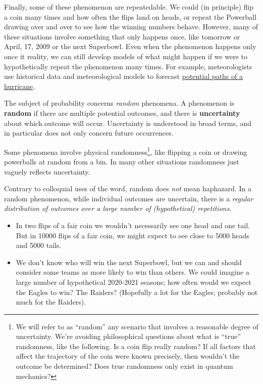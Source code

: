 \documentclass[
]{book}
\providecommand{\tightlist}{%
  \setlength{\itemsep}{0pt}\setlength{\parskip}{0pt}}
\theoremstyle{definition}
\theoremstyle{definition}
\theoremstyle{definition}
\theoremstyle{remark}
\begin{document}
Finally, some of these phenomenon are repeatedable. We could (in principle) flip a coin many times and how often the flips land on heads, or repeat the Powerball drawing over and over to see how the winning numbers behave. However, many of these situations involve something that only happens once, like tomorrow or April, 17, 2009 or the next Superbowl. Even when the phenomenon happens only once it reality, we can still develop models of what might happen if we were to hypothetically repeat the phenomenon many times. For example, meteorologists use historical data and meteorological models to forecast \href{https://www.nhc.noaa.gov/cone_usage.php}{potential paths of a hurricane}.

The subject of probability concerns \emph{random} phenomena. A phenomenon is \textbf{random} if there are multiple potential outcomes, and there is \textbf{uncertainty} about which outcome will occur. Uncertainty is understood in broad terms, and in particular does not only concern future occurrences.

Some phenomena involve physical randomness\footnote{We will refer to as ``random'' any scenario that involves a reasonable degree of uncertainty. We're avoiding philosophical questions about what is ``true'' randomness, like the following. Is a coin flip really random? If all factors that affect the trajectory of the coin were known precisely, then wouldn't the outcome be determined? Does true randomness only exist in quantum mechanics?}, like flipping a coin or drawing powerballs at random from a bin. In many other situations randomness just vaguely reflects uncertainty.

Contrary to colloquial uses of the word, random does \emph{not} mean haphazard. In a random phenomenon, while
individual outcomes are uncertain, there is a \emph{regular distribution of
outcomes over a large number of (hypothetical) repetitions}.

\begin{itemize}
\tightlist
\item
  In two flips of a fair coin we wouldn't necessarily see one head and one tail. But in 10000 flips of a fair coin, we might expect to see close to 5000 heads and 5000 tails.
\item
  We don't know who will win the next Superbowl, but we can and should consider some teams as more likely to win than others. We could imagine a large number of hypothetical 2020-2021 seasons; how often would we expect the Eagles to win? The Raiders? (Hopefully a lot for the Eagles; probably not much for the Raiders).
\end{itemize}
\end{document}
